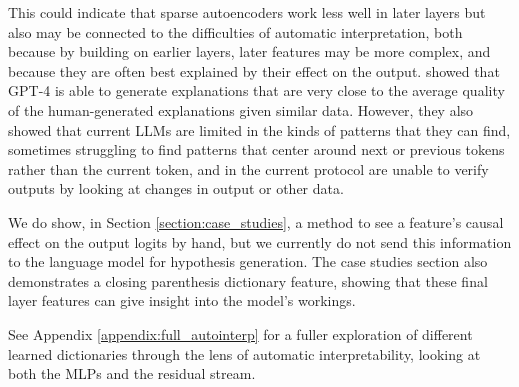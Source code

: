 This could indicate that sparse autoencoders work less well in later layers but also may be connected to the difficulties of automatic interpretation, both because by building on earlier layers, later features may be more complex, and because they are often best explained by their effect on the output. \citet{bills2023language} showed that GPT-4 is able to generate explanations that are very close to the average quality of the human-generated explanations given similar data. However, they also showed that current LLMs are limited in the kinds of patterns that they can find, sometimes struggling to find patterns that center around next or previous tokens rather than the current token, and in the current protocol are unable to verify outputs by looking at changes in output or other data. 

We do show, in Section \ref{section:case_studies}, a method to see a feature's causal effect on the output logits by hand, but we currently do not send this information to the language model for hypothesis generation. The case studies section also demonstrates a closing parenthesis dictionary feature, showing that these final layer features can give insight into the model's workings.

See Appendix \ref{appendix:full_autointerp} for a fuller exploration of different learned dictionaries through the lens of automatic interpretability, looking at both the MLPs and the residual stream.